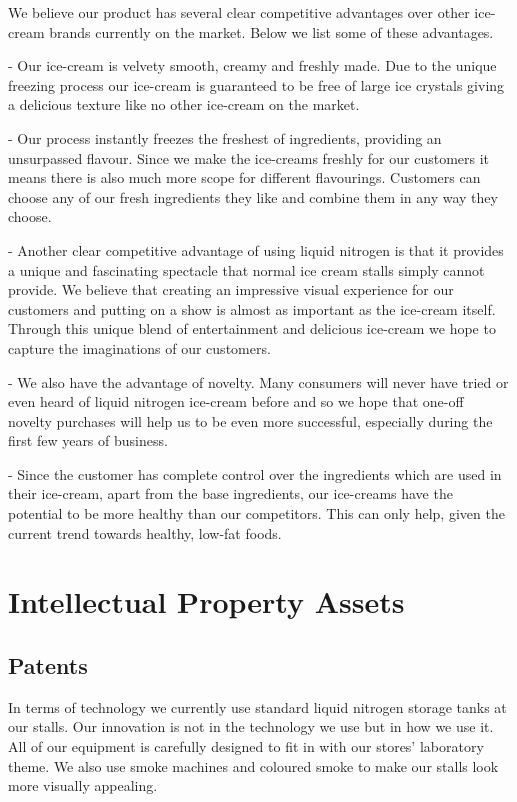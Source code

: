 \documentclass{article}
\begin{document}
We believe our product has several clear competitive advantages over
other ice-cream brands currently on the market. Below we list some of these advantages.

 - Our ice-cream is velvety smooth, creamy and freshly made. Due to
the unique freezing process our ice-cream is guaranteed to be free of
large ice crystals giving a delicious texture like no other ice-cream on the
market.

 - Our process instantly freezes the freshest of ingredients, providing
an unsurpassed flavour. Since we make the ice-creams freshly for
our customers it means there is also much more scope for different
flavourings. Customers can choose any of our fresh ingredients they like and combine them in any way they choose.

 - Another clear competitive advantage of using liquid nitrogen is that
it provides a unique and fascinating spectacle that normal ice cream
stalls simply cannot provide. We believe that creating an impressive
visual experience for our customers and putting on a show is almost
as important as the ice-cream itself. Through this unique blend
of entertainment and delicious ice-cream we hope to capture the
imaginations of our customers.

 - We also have the advantage of novelty. Many consumers will never
have tried or even heard of liquid nitrogen ice-cream before and so
we hope that one-off novelty purchases will help us to be even more
successful, especially during the first few years of business.

 - Since the customer has complete control over the ingredients which are used in their ice-cream, apart from the base ingredients, our ice-creams have the potential to be more healthy than our competitors. This can only help, given the current trend towards healthy, low-fat foods.

\section{Intellectual Property Assets}

  \subsection{Patents}

In terms of technology we currently use standard liquid nitrogen storage tanks at our stalls. Our innovation is not in the technology we use but in how we use it. All of our equipment is carefully designed to fit in with our stores' laboratory theme. We also use smoke machines and coloured smoke to make our stalls look more visually appealing.
\end{document}

